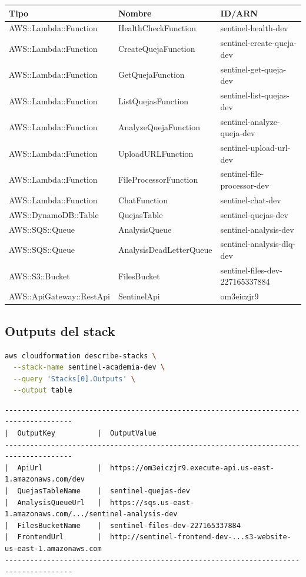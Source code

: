 \documentclass[11pt,a4paper,oneside]{article}
\begin{document}
\begin{center}
\begin{tabular}{lll}
\toprule
\textbf{Tipo} & \textbf{Nombre} & \textbf{ID/ARN} \\
\midrule
AWS::Lambda::Function & HealthCheckFunction & sentinel-health-dev \\
AWS::Lambda::Function & CreateQuejaFunction & sentinel-create-queja-dev \\
AWS::Lambda::Function & GetQuejaFunction & sentinel-get-queja-dev \\
AWS::Lambda::Function & ListQuejasFunction & sentinel-list-quejas-dev \\
AWS::Lambda::Function & AnalyzeQuejaFunction & sentinel-analyze-queja-dev \\
AWS::Lambda::Function & UploadURLFunction & sentinel-upload-url-dev \\
AWS::Lambda::Function & FileProcessorFunction & sentinel-file-processor-dev \\
AWS::Lambda::Function & ChatFunction & sentinel-chat-dev \\
\midrule
AWS::DynamoDB::Table & QuejasTable & sentinel-quejas-dev \\
AWS::SQS::Queue & AnalysisQueue & sentinel-analysis-dev \\
AWS::SQS::Queue & AnalysisDeadLetterQueue & sentinel-analysis-dlq-dev \\
AWS::S3::Bucket & FilesBucket & sentinel-files-dev-227165337884 \\
AWS::ApiGateway::RestApi & SentinelApi & om3eiczjr9 \\
\bottomrule
\end{tabular}
\end{center}

\subsection{Outputs del stack}

\begin{lstlisting}[language=bash,caption={Obtener outputs}]
aws cloudformation describe-stacks \
  --stack-name sentinel-academia-dev \
  --query 'Stacks[0].Outputs' \
  --output table
\end{lstlisting}

\begin{lstlisting}[caption={Output esperado}]
--------------------------------------------------------------------------------------
|  OutputKey          |  OutputValue
--------------------------------------------------------------------------------------
|  ApiUrl             |  https://om3eiczjr9.execute-api.us-east-1.amazonaws.com/dev
|  QuejasTableName    |  sentinel-quejas-dev
|  AnalysisQueueUrl   |  https://sqs.us-east-1.amazonaws.com/.../sentinel-analysis-dev
|  FilesBucketName    |  sentinel-files-dev-227165337884
|  FrontendUrl        |  http://sentinel-frontend-dev-...s3-website-us-east-1.amazonaws.com
--------------------------------------------------------------------------------------
\end{lstlisting}
\end{document}
